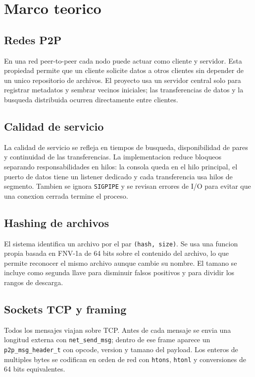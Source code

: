 \section{Marco teorico}

\subsection{Redes P2P}

En una red peer-to-peer cada nodo puede actuar como cliente y servidor. Esta
propiedad permite que un cliente solicite datos a otros clientes sin depender
de un unico repositorio de archivos. El proyecto usa un servidor central solo
para registrar metadatos y sembrar vecinos iniciales; las transferencias de
datos y la busqueda distribuida ocurren directamente entre clientes.

\subsection{Calidad de servicio}

La calidad de servicio se refleja en tiempos de busqueda, disponibilidad de
pares y continuidad de las transferencias. La implementacion reduce bloqueos
separando responsabilidades en hilos: la consola queda en el hilo principal,
el puerto de datos tiene un listener dedicado y cada transferencia usa hilos de
segmento. Tambien se ignora \texttt{SIGPIPE} y se revisan errores de I/O para
evitar que una conexion cerrada termine el proceso.

\subsection{Hashing de archivos}

El sistema identifica un archivo por el par \texttt{(hash, size)}. Se usa una
funcion propia basada en FNV-1a de 64 bits sobre el contenido del archivo, lo
que permite reconocer el mismo archivo aunque cambie su nombre. El tamano se
incluye como segunda llave para disminuir falsos positivos y para dividir los
rangos de descarga.

\subsection{Sockets TCP y framing}

Todos los mensajes viajan sobre TCP. Antes de cada mensaje se envia una
longitud externa con \texttt{net\_send\_msg}; dentro de ese frame aparece un
\texttt{p2p\_msg\_header\_t} con opcode, version y tamano del payload. Los
enteros de multiples bytes se codifican en orden de red con \texttt{htons},
\texttt{htonl} y conversiones de 64 bits equivalentes.

